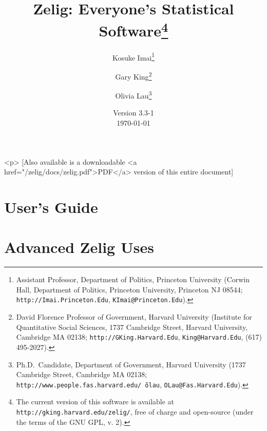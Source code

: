 
\title{Zelig: Everyone's Statistical Software\thanks{The current
    version of this software is available at
    \texttt{http://gking.harvard.edu/zelig/}, free of charge and
    open-source (under the terms of the GNU GPL, v. 2).}}
\author{Kosuke
  Imai\thanks{Assistant Professor, Department of Politics, Princeton
    University (Corwin Hall, Department of Politics, Princeton
    University, Princeton NJ 08544; \texttt{http://Imai.Princeton.Edu},
    \texttt{KImai@Princeton.Edu}).}
\and %
Gary King\thanks{David Florence Professor of Government, Harvard
  University (Institute for Quantitative Social Sciences, 1737 Cambridge 
Street, Harvard University, Cambridge MA 02138;
  \texttt{http://GKing.Harvard.Edu}, \texttt{King@Harvard.Edu}, (617)
  495-2027).}
\and %
Olivia Lau\thanks{Ph.D.\ Candidate, Department of Government, Harvard
  University (1737 Cambridge Street, Cambridge MA 02138;
  \texttt{http://www.people.fas.harvard.edu/\~\,olau},
  \texttt{OLau@Fas.Harvard.Edu}).}}

\date{Version 3.3-1\\ \today}


\maketitle
\begin{rawhtml}
  <p>
  [Also available is a downloadable <a href="/zelig/docs/zelig.pdf">PDF</a>
  version of this entire document]
\end{rawhtml}

\tableofcontents

\nobibliography*





\part[User's Guide]{User's Guide}






\part{Advanced Zelig Uses}






